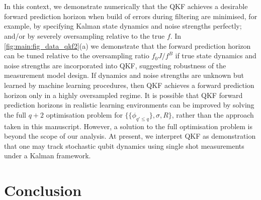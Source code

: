 \documentclass[pra, reprint]{revtex4-1}
\begin{document}
\\
\\
In this context, we demonstrate numerically that the QKF achieves a desirable forward prediction horizon when build of errors during filtering are minimised, for example, by specifying Kalman state dynamics and noise strengths perfectly; and/or by severely oversampling relative to the true $f$.   In \cref{fig:main:fig_data_qkf2}(a) we demonstrate that the forward prediction horizon can be tuned relative to the oversampling ratio $f_0J / f^B$ if true state dynamics and noise strengths are incorporated into QKF, suggesting robustness of the measurement model design.  If dynamics and noise strengths are unknown but learned by machine learning procedures, then QKF achieves a forward prediction horizon only in a highly oversampled regime. It is possible that QKF forward prediction horizons in realistic learning environments can be improved by solving the full $q+2$ optimisation problem for $\{\{ \phi_{q' \leq q}\}, \sigma, R\}$, rather than the approach taken in this manuscript. However, a solution to the full optimisation problem is beyond the scope of our analysis. At present, we interpret QKF as demonstration that one may track stochastic qubit dynamics using single shot measurements under a Kalman framework.

\section{Conclusion \label{sec:main:Conclusion}}
\end{document}
